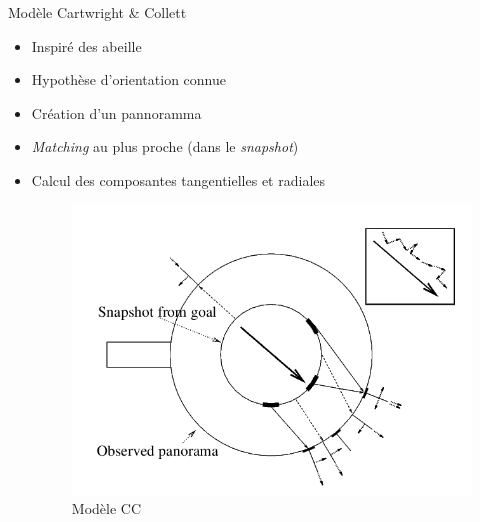 \documentclass{beamer}
\begin{document}
\begin{frame}
  \begin{block}{Modèle Cartwright \& Collett \cite{Carwright1983}}
    \begin{itemize}
      \item Inspiré des abeille
      \item Hypothèse d'orientation connue
      \item Création d'un pannoramma
      \item \textit{Matching} au plus proche (dans le \textit{snapshot})
      \item Calcul des composantes tangentielles et radiales    
      \begin{figure}
        \centering
        \includegraphics[scale=0.2]{cc_model.png}
        \caption{Modèle CC}
      \end{figure}
    \end{itemize}
  \end{block}
\end{frame}
\end{document}
